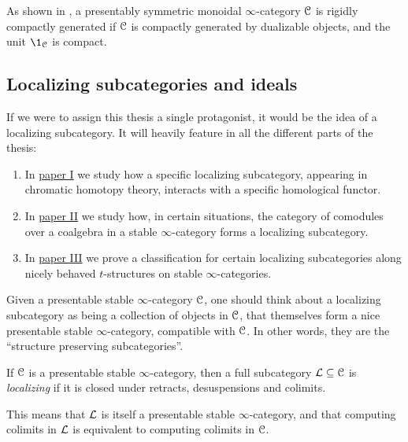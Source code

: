 \begin{remark}
    \label{ch0:rm:compacts-equal-dualizable}
    As shown in \cite[2.1.3]{hovey-palmiery-strickland_97}, a presentably symmetric monoidal $\infty$-category $\EuScript{C}$ is rigidly compactly generated if $\EuScript{C}$ is compactly generated by dualizable objects, and the unit $\1_\C$ is compact. 
\end{remark}







\subsection{Localizing subcategories and ideals}
\label{ch0:ssec:localizing-subcategories-and-ideals}

If we were to assign this thesis a single protagonist, it would be the idea of a localizing subcategory. It will heavily feature in all the different parts of the thesis: 
\begin{enumerate}
    \item In \hyperref[ch1]{paper I} we study how a specific localizing subcategory, appearing in chromatic homotopy theory, interacts with a specific homological functor.
    \item In \hyperref[ch2]{paper II} we study how, in certain situations, the category of comodules over a coalgebra in a stable $\infty$-category forms a localizing subcategory. 
    \item In \hyperref[ch3]{paper III} we prove a classification for certain localizing subcategories along nicely behaved $t$-structures on stable $\infty$-categories. 
\end{enumerate}

Given a presentable stable $\infty$-category $\EuScript{C}$, one should think about a localizing subcategory as being a collection of objects in $\EuScript{C}$, that themselves form a nice presentable stable $\infty$-category, compatible with $\EuScript{C}$. In other words, they are the ``structure preserving subcategories''.

\begin{definition}
    \label{ch0:def:localizing-subcategory}
    If $\EuScript{C}$ is a presentable stable $\infty$-category, then a full subcategory $\mathcal{L}\subseteq \EuScript{C}$ is \emph{localizing} if it is closed under retracts, desuspensions and colimits. 
\end{definition}

This means that $\mathcal{L}$ is itself a presentable stable $\infty$-category, and that computing colimits in $\mathcal{L}$ is equivalent to computing colimits in $\EuScript{C}$. 

